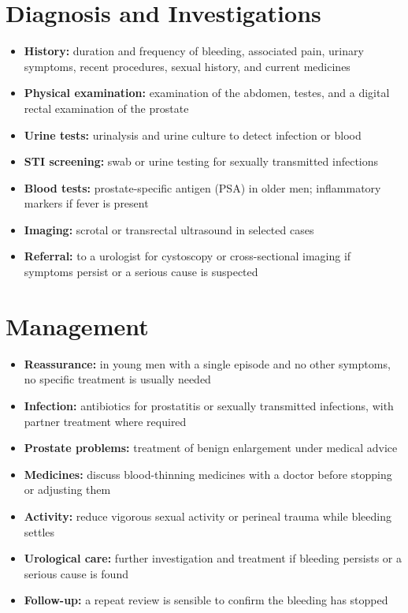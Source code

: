 \section*{Diagnosis and Investigations}
\begin{itemize}
    \item \textbf{History:} duration and frequency of bleeding, associated pain, urinary symptoms, recent procedures, sexual history, and current medicines
    \item \textbf{Physical examination:} examination of the abdomen, testes, and a digital rectal examination of the prostate
    \item \textbf{Urine tests:} urinalysis and urine culture to detect infection or blood
    \item \textbf{STI screening:} swab or urine testing for sexually transmitted infections
    \item \textbf{Blood tests:} prostate-specific antigen (PSA) in older men; inflammatory markers if fever is present
    \item \textbf{Imaging:} scrotal or transrectal ultrasound in selected cases
    \item \textbf{Referral:} to a urologist for cystoscopy or cross-sectional imaging if symptoms persist or a serious cause is suspected
\end{itemize}

\section*{Management}
\begin{itemize}
    \item \textbf{Reassurance:} in young men with a single episode and no other symptoms, no specific treatment is usually needed
    \item \textbf{Infection:} antibiotics for prostatitis or sexually transmitted infections, with partner treatment where required
    \item \textbf{Prostate problems:} treatment of benign enlargement under medical advice
    \item \textbf{Medicines:} discuss blood-thinning medicines with a doctor before stopping or adjusting them
    \item \textbf{Activity:} reduce vigorous sexual activity or perineal trauma while bleeding settles
    \item \textbf{Urological care:} further investigation and treatment if bleeding persists or a serious cause is found
    \item \textbf{Follow-up:} a repeat review is sensible to confirm the bleeding has stopped
\end{itemize}

